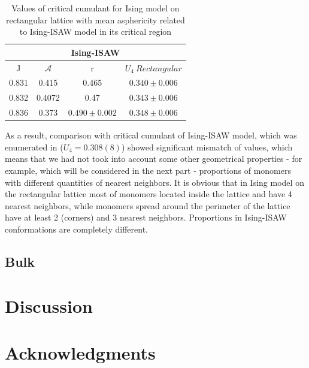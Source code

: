 \documentclass[aps,pre,amssymb,amsmath,twocolumn,floatfix]{revtex4-2}
\begin{document}
\begin{table}[h!]
    \centering
    \begin{tabular}{|c|c|c|c|}
        \hline
         \multicolumn{4}{|c|}{Ising-ISAW}  \\ \hline
         J & $\mathcal{A}$ & r & $U_{4}\  Rectangular$ \\ \hline
         0.831 & 0.415 & 0.465 & $0.340 \pm 0.006$\\ \hline
         0.832 & 0.4072 & 0.47 & $0.343 \pm 0.006$\\ \hline
         0.836 & 0.373 & $0.490 \pm 0.002$ & $0.348 \pm 0.006$\\ \hline
         \end{tabular}
    \caption{Values of critical cumulant for Ising model on rectangular lattice with mean asphericity related to Ising-ISAW model in its critical region}
    \label{tab:A_r_U}
\end{table}

As a result, comparison with critical cumulant of Ising-ISAW model, which was enumerated in \cite{faizullina2021critical} ($U_{4} = 0.308(8)$) showed significant mismatch of values, which means that we had not took into account some other geometrical properties - for example, which will be considered in the next part - proportions of monomers with different quantities of nearest neighbors. It is obvious that in Ising model on the rectangular lattice most of monomers located inside the lattice and have 4 nearest neighbors, while monomers spread around the perimeter of the lattice have at least 2 (corners) and 3 nearest neighbors. Proportions in Ising-ISAW conformations are completely different.

\subsection{Bulk}

\section{Discussion}

\section{Acknowledgments}


\end{document}
